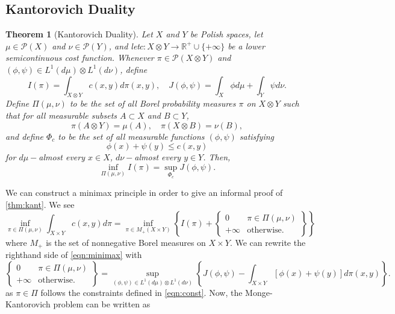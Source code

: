 \documentclass[12pt]{article}
\theoremstyle{plain}
\newtheorem{thm}{Theorem}[section]
\numberwithin{equation}{section}
\begin{document}
\subsection{Kantorovich Duality}
\begin{thm}[Kantorovich Duality]\label{thm:kant}
Let $X$ and $Y$ be Polish spaces, let $\mu\in \mathcal{P}(X)$ and $\nu\in\mathcal{P}(Y)$, and let\hfill\break $c: X\otimes Y\to \mathbb{R}^+\cup\{+\infty\}$ be a lower semicontinuous cost function.
Whenever $\pi \in \mathcal{P}(X\otimes Y)$ and $(\phi,\psi)\in L^1(d\mu)\otimes L^1(d\nu)$, define 
  \[I(\pi)= \int_{X\otimes Y}c(x,y)d\pi(x,y),\quad J(\phi,\psi) = \int_X\phi d\mu + \int_Y\psi d\nu.\]
  Define $\Pi(\mu,\nu)$ to be the set of all Borel probability measures $\pi$ on $X\otimes Y$ such that for all measurable subsets $A\subset X$ and $B\subset Y$,
  \[\pi(A\otimes Y) = \mu(A),\quad \pi(X\otimes B)= \nu(B),\]
  and define $\Phi_c$ to be the set of all measurable functions $(\phi,\psi)$ satisfying
  \begin{equation}\label{eqn:dualconst}
    \phi(x) + \psi(y) \le c(x,y)
  \end{equation}
  for $d\mu-$almost every $x\in X$, $d\nu-$almost every $y\in Y$. Then,
  \begin{equation}
    \inf_{\Pi(\mu,\nu)} I(\pi) = \sup_{\Phi_c}{J(\phi,\psi)}.
  \end{equation}
\end{thm}
We can construct a minimax principle in order to give an informal proof of \autoref{thm:kant}. We see 
\begin{equation}\label{eqn:minimax}
  \inf_{\pi\in\Pi(\mu,\nu)} \int_{X\times Y}c(x,y)d\pi = \inf_{\pi\in M_+(X\times Y)} \left\{I(\pi)+ \left\{\begin{matrix}0 &\pi\in\Pi(\mu,\nu) \\ +\infty &\text{otherwise.}\end{matrix}\right\} \right\}
\end{equation}
where $M_+$ is the set of nonnegative Borel measures on $X\times Y$. We can rewrite the righthand side of \autoref{eqn:minimax} with
\[\left\{\begin{matrix}0 &\pi\in\Pi(\mu,\nu) \\ +\infty &\text{otherwise.}\end{matrix}\right\} =\sup_{(\phi,\psi)\in L^1(d\mu)\otimes L^1(d\nu)}\left\{J(\phi,\psi)- \int_{X\times Y} [\phi(x)+\psi(y)]d\pi(x,y)\right\}.\]
as $\pi\in \Pi$ follows the constraints defined in \autoref{eqn:const}. Now, the Monge-Kantorovich problem can be written as 
\end{document}
